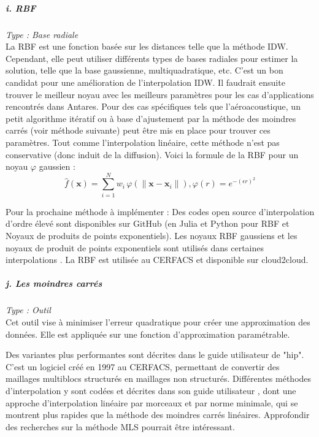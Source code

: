 \subparagraph{i. RBF \cite{opencfs}}
\textit{Type : Base radiale} \\
\phantom{----}La \ac{RBF} est une fonction basée sur les distances telle que la méthode IDW. Cependant, elle peut utiliser différents types de bases radiales pour estimer la solution, telle que la base gaussienne, multiquadratique, etc. C'est un bon candidat pour une amélioration de l'interpolation IDW. Il faudrait ensuite trouver le meilleur noyau avec les meilleurs paramètres pour les cas d'applications rencontrés dans Antares. Pour des cas spécifiques tels que l'aéroacoustique, un petit algorithme itératif ou à base d'ajustement par la méthode des moindres carrés (voir méthode suivante) peut être mis en place pour trouver ces paramètres. Tout comme l'interpolation linéaire, cette méthode n'est pas conservative (donc induit de la diffusion).
Voici la formule de la RBF pour un noyau \(\varphi\) gaussien :
\begin{equation}
    \hat{f}(\mathbf{x}) = \sum_{i=1}^{N} w_{i} \, \varphi \left( \|\mathbf{x} - \mathbf{x}_{i}\| \right), \varphi(r) = e^{-(\epsilon r)^{2}}
\end{equation}

Pour la prochaine méthode à implémenter : Des codes open source d'interpolation d'ordre élevé sont disponibles sur GitHub (en Julia \cite{opensource} et Python \cite{opensource_2} pour RBF et Noyaux de produits de points exponentiels)\cite{Rosenfeld}. Les noyaux RBF gaussiens et les noyaux de produit de points exponentiels sont utilisés dans certaines interpolations \cite{opensource_2}. La RBF est utilisée au CERFACS et disponible sur cloud2cloud. %

\subparagraph{j. Les moindres carrés} %
\textit{Type : Outil} \\ %
\phantom{----}
Cet outil vise à minimiser l'erreur quadratique pour créer une approximation des données. Elle est appliquée sur une fonction d'approximation paramétrable.

Des variantes plus performantes sont décrites dans le guide utilisateur de "hip".
C'est un logiciel créé en 1997 au CERFACS, permettant de convertir des maillages multiblocs structurés en maillages non structurés.
Différentes méthodes d'interpolation y sont codées et décrites dans son guide utilisateur \cite{muller2020}, dont une approche d'interpolation linéaire par morceaux et par norme minimale, qui se montrent plus rapides que la méthode des moindres carrés linéaires.
Approfondir des recherches sur la méthode \ac{MLS} \cite{levin, MLS} pourrait être intéressant.

